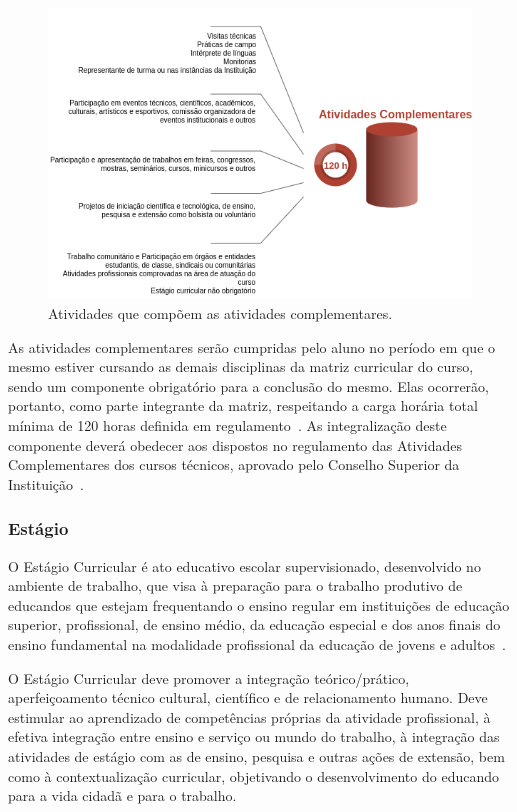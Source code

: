 \documentclass[11pt,fleqn]{book} %
\begin{document}
\begin{figure}[!htp]
	\centering	
	\includegraphics[width=.9\textwidth]{Pictures/AtividadesComplementares.png}
	\caption{Atividades que compõem as atividades complementares.}
	\label{fig:AtividadesComplementares}
\end{figure}

As atividades complementares serão cumpridas pelo aluno no período em que o mesmo estiver cursando as demais disciplinas da matriz curricular do curso, sendo um componente obrigatório para a conclusão do mesmo.
Elas ocorrerão, portanto, como parte integrante da matriz, respeitando a carga horária total mínima de 120 horas definida em regulamento~\cite{Resolucao20De2011}.
As integralização deste componente deverá obedecer aos dispostos no regulamento das Atividades Complementares dos cursos técnicos, aprovado pelo Conselho Superior da Instituição~\cite{Resolucao20De2011}.

\subsubsection{Estágio}
\indent

O Estágio Curricular é ato educativo escolar supervisionado, desenvolvido no ambiente de trabalho, que visa à preparação para o trabalho produtivo de educandos que estejam frequentando o ensino regular em instituições de educação superior, profissional, de ensino médio, da educação especial e dos anos finais do ensino fundamental na modalidade profissional da educação de jovens e adultos~\cite{Lei11788De2008}.

O Estágio Curricular deve promover a integração teórico/prático, aperfeiçoamento técnico cultural, científico e de relacionamento humano.  
Deve estimular ao aprendizado de competências próprias da atividade profissional, à efetiva integração entre ensino e serviço ou mundo do trabalho, à integração das atividades de estágio com as de ensino, pesquisa e outras ações de extensão, bem como à contextualização curricular, objetivando o desenvolvimento do educando para a vida cidadã e para o trabalho.
\end{document}
